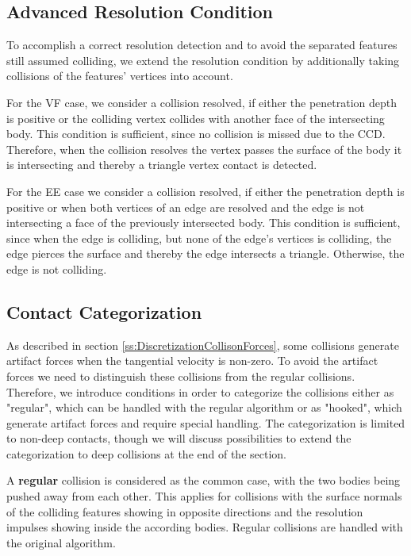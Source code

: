 \subsection{Advanced Resolution Condition}
\label{ss:AdvResCond}
To accomplish a correct resolution detection and to avoid the separated features still assumed colliding, we extend the resolution condition by additionally taking collisions of the features' vertices into account.

For the VF case, we consider a collision resolved, if either the penetration depth is positive or the colliding vertex collides with another face of the intersecting body. This condition is sufficient, since no collision is missed due to the CCD. Therefore, when the collision resolves the vertex passes the surface of the body it is intersecting and thereby a triangle vertex contact is detected. 

For the EE case we consider a collision resolved, if either the penetration depth is positive or when both vertices of an edge are resolved and the edge is not intersecting a face of the previously intersected body.
This condition is sufficient, since when the edge is colliding, but none of the edge's vertices is colliding, the edge pierces the surface and thereby the edge intersects a triangle. Otherwise, the edge is not colliding.

\subsection{Contact Categorization}
\label{ss::ContactCategorization}
As described in section \ref{ss:DiscretizationCollisonForces}, some collisions generate artifact forces when the tangential velocity is non-zero. To avoid the artifact forces we need to distinguish these collisions from the regular collisions. Therefore, we introduce conditions in order to categorize the collisions either as "regular", which can be handled with the regular algorithm or as "hooked", which generate artifact forces and require special handling. The categorization is limited to non-deep contacts, though we will discuss possibilities to extend the categorization to deep collisions at the end of the section.

A \textbf{regular} collision is considered as the common case, with the two bodies being pushed away from each other. This applies for collisions with the surface normals of the colliding features showing in opposite directions and the resolution impulses showing inside the according bodies. Regular collisions are handled with the original algorithm.

